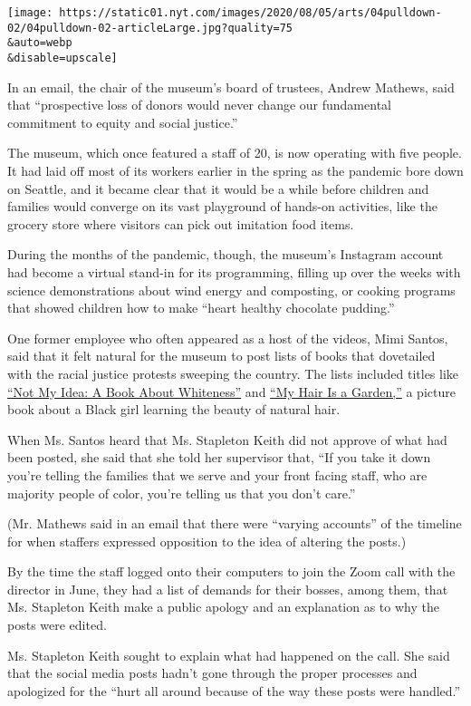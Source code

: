 \texttt{[image: https://static01.nyt.com/images/2020/08/05/arts/04pulldown-02/04pulldown-02-articleLarge.jpg?quality=75\\\&auto=webp\\\&disable=upscale]}

In an email, the chair of the museum's board of trustees, Andrew
Mathews, said that ``prospective loss of donors would never change our
fundamental commitment to equity and social justice.''

The museum, which once featured a staff of 20, is now operating with
five people. It had laid off most of its workers earlier in the spring
as the pandemic bore down on Seattle, and it became clear that it would
be a while before children and families would converge on its vast
playground of hands-on activities, like the grocery store where visitors
can pick out imitation food items.

During the months of the pandemic, though, the museum's Instagram
account had become a virtual stand-in for its programming, filling up
over the weeks with science demonstrations about wind energy and
composting, or cooking programs that showed children how to make ``heart
healthy chocolate pudding.''

One former employee who often appeared as a host of the videos, Mimi
Santos, said that it felt natural for the museum to post lists of books
that dovetailed with the racial justice protests sweeping the country.
The lists included titles like
\href{https://anastasiahigginbotham.com/not-my-idea/}{``Not My Idea: A
Book About Whiteness''} and
\href{https://www.albertwhitman.com/book/my-hair-is-a-garden/}{``My Hair
Is a Garden,''} a picture book about a Black girl learning the beauty of
natural hair.

When Ms. Santos heard that Ms. Stapleton Keith did not approve of what
had been posted, she said that she told her supervisor that, ``If you
take it down you're telling the families that we serve and your front
facing staff, who are majority people of color, you're telling us that
you don't care.''

(Mr. Mathews said in an email that there were ``varying accounts'' of
the timeline for when staffers expressed opposition to the idea of
altering the posts.)

By the time the staff logged onto their computers to join the Zoom call
with the director in June, they had a list of demands for their bosses,
among them, that Ms. Stapleton Keith make a public apology and an
explanation as to why the posts were edited.

Ms. Stapleton Keith sought to explain what had happened on the call. She
said that the social media posts hadn't gone through the proper
processes and apologized for the ``hurt all around because of the way
these posts were handled.''

